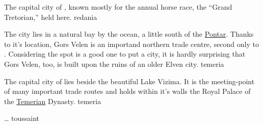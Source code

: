 {
    The capital city of , known mostly for the annual horse race, the ``Grand Tretorian,'' held here.
}
{redania}

{
    The city lies in a natural bay by the ocean, a little south of the \hyperref[region:pontar]{Pontar}. Thanks to it's location,
    Gors Velen is an importand northern trade centre, second only to . Considering the spot is a good one
    to put a city, it is hardly surprising that Gors Velen, too, is built upon the ruins of an older Elven city.
}
{temeria}

{
    The capital city of  lies beside the beautiful Lake Vizima. It is the meeting-point of many
    important trade routes and holds within it's walls the Royal Palace of the \hyperref[realm:temeria]{Temerian} Dynasty.
}
{temeria}

{
\dots
}
{toussaint}